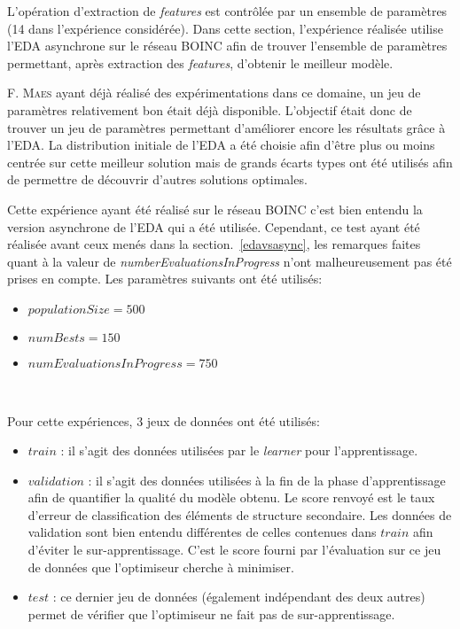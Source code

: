 \documentclass[a4paper, 12pt]{report}
\begin{document}
L'opération d'extraction de \textit{features} est contrôlée par un ensemble de paramètres (14 dans l'expérience considérée). Dans cette section, l'expérience réalisée utilise l'EDA asynchrone sur le réseau \textsc{BOINC} afin de trouver l'ensemble de paramètres permettant, après extraction des \textit{features}, d'obtenir le meilleur modèle. 
 
F. \textsc{Maes} ayant déjà réalisé des expérimentations dans ce domaine, un jeu de paramètres relativement bon était déjà disponible. L'objectif était donc de trouver un jeu de paramètres permettant d'améliorer encore les résultats grâce à l'EDA. La distribution initiale de l'EDA a été choisie afin d'être plus ou moins centrée sur cette meilleur solution mais de grands écarts types ont été utilisés afin de permettre de découvrir d'autres solutions optimales. 

Cette expérience ayant été réalisé sur le réseau \textsc{BOINC} c'est bien entendu la version asynchrone de l'EDA qui a été utilisée. Cependant, ce test ayant été réalisée avant ceux menés dans la section.~\ref{edavsasync}, les remarques faites quant à la valeur de \textit{numberEvaluations\-InProgress} n'ont malheureusement pas été prises en compte. Les paramètres suivants ont été utilisés:
\begin{itemize}
\item $populationSize = 500$
\item $numBests = 150$
\item $numEvaluationsInProgress = 750$
\end{itemize}
\ 

Pour cette expériences, 3 jeux de données ont été utilisés:
\begin{itemize}
\item $train$ : il s'agit des données utilisées par le \textit{learner} pour l'apprentissage. 
\item $validation$ : il s'agit des données utilisées à la fin de la phase d'apprentissage afin de quantifier la qualité du modèle obtenu. Le score renvoyé est le taux d'erreur de classification des éléments de structure secondaire. Les données de validation sont bien entendu différentes de celles contenues dans $train$ afin d'éviter le sur-apprentissage. C'est le score fourni par l'évaluation sur ce jeu de données que l'optimiseur cherche à minimiser.
\item $test$ : ce dernier jeu de données (également indépendant des deux autres) permet de vérifier que l'optimiseur ne fait pas de sur-apprentissage.
\end{itemize}
\end{document}
